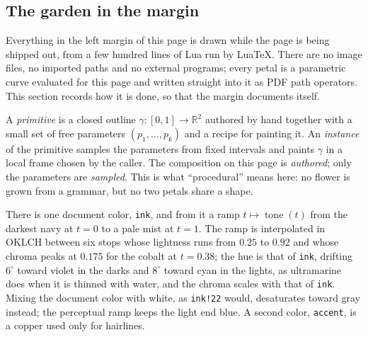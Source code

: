 
\setcounter{section}{3}\setcounter{subsection}{1}
\subsection{The garden in the margin}

Everything in the left margin of this page is drawn while the page is
being shipped out,
from a few hundred lines of Lua run by Lua\TeX. There are no image
files, no imported
paths and no external programs; every petal is a parametric curve
evaluated for this page
and written straight into it as PDF path operators. This section
records how it is done,
so that the margin documents itself.

\begin{definition}
  A \emph{primitive} is a closed outline
  $\gamma\colon[0,1]\to\mathbb{R}^2$ authored by hand
  together with a small set of free parameters $(p_1,\dots,p_k)$ and
  a recipe for painting
  it. An \emph{instance} of the primitive samples the parameters from
  fixed intervals and
  paints $\gamma$ in a local frame chosen by the caller. The
  composition on this page is
  \emph{authored}; only the parameters are \emph{sampled}. This is
  what ``procedural'' means
  here: no flower is grown from a grammar, but no two petals share a shape.
\end{definition}

\begin{construction}[Palette]
  There is one document color, \texttt{ink}, and from it a ramp
  $t\mapsto\operatorname{tone}(t)$
  from the darkest navy at $t=0$ to a pale mist at $t=1$. The ramp is
  interpolated in
  OKLCH between six stops whose lightness runs from $0.25$ to $0.92$
  and whose chroma peaks
  at $0.175$ for the cobalt at $t=0.38$; the hue is that of
  \texttt{ink}, drifting $6^\circ$
  toward violet in the darks and $8^\circ$ toward cyan in the lights,
  as ultramarine does when
  it is thinned with water, and the chroma scales with that of
  \texttt{ink}. Mixing the
  document color with white, as \texttt{ink!22} would, desaturates
  toward gray instead;
  the perceptual ramp keeps the light end blue. A second color,
  \texttt{accent}, is a copper
  used only for hairlines.
\end{construction}

